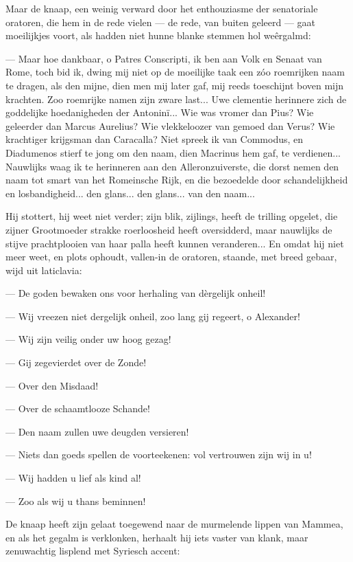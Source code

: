 \documentclass[a4paper, 12pt, oneside, dutch]{article}
\begin{document}
Maar de knaap, een weinig verward door het enthouziasme der senatoriale oratoren, die hem in de rede vielen --- de rede, van buiten geleerd --- gaat moeilijkjes voort, als hadden niet hunne blanke stemmen hol weêrgalmd:

--- Maar hoe dankbaar, o Patres Conscripti, ik ben aan Volk en Senaat van Rome, toch bid ik, dwing mij niet op de moeilijke taak een zóo roemrijken naam te dragen, als den mijne, dien men mij later gaf, mij reeds toeschijnt boven mijn krachten. Zoo roemrijke namen zijn zware last... Uwe clementie herinnere zich de goddelijke hoedanigheden der Antoninï... Wie was vromer dan Pius? Wie geleerder dan Marcus Aurelius? Wie vlekkeloozer van gemoed dan Verus? Wie krachtiger krijgsman dan Caracalla? Niet spreek ik van Commodus, en Diadumenos stierf te jong om den naam, dien Macrinus hem gaf, te verdienen... Nauwlijks waag ik te herinneren aan den Alleronzuiverste, die dorst nemen den naam tot smart van het Romeinsche Rijk, en die bezoedelde door schandelijkheid en losbandigheid... den glans... den glans... van den naam...

Hij stottert, hij weet niet verder; zijn blik, zijlings, heeft de trilling opgelet, die zijner Grootmoeder strakke roerloosheid heeft oversidderd, maar nauwlijks de stijve prachtplooien van haar palla heeft kunnen veranderen... En omdat hij niet meer weet, en plots ophoudt, vallen-in de oratoren, staande, met breed gebaar, wijd uit laticlavia:

--- De goden bewaken ons voor herhaling van dèrgelijk onheil!

--- Wij vreezen niet dergelijk onheil, zoo lang gij regeert, o Alexander!

--- Wij zijn veilig onder uw hoog gezag!

--- Gij zegevierdet over de Zonde!

--- Over den Misdaad!

--- Over de schaamtlooze Schande!

--- Den naam zullen uwe deugden versieren!

--- Niets dan goeds spellen de voorteekenen: vol vertrouwen zijn wij in u!

--- Wij hadden u lief als kind al!

--- Zoo als wij u thans beminnen!

De knaap heeft zijn gelaat toegewend naar de murmelende lippen van Mammea, en als het gegalm is verklonken, herhaalt hij iets vaster van klank, maar zenuwachtig lisplend met Syriesch accent:
\end{document}
